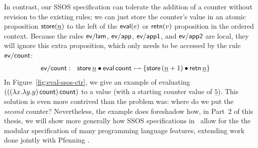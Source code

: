 In contrast, our SSOS specification can tolerate the
addition of a counter without revision to the existing rules; we can
just store the counter's value in an atomic proposition ${\sf
  store}(\underline{n})$ to the left of the ${\sf eval}(e)$ or ${\sf
  retn}(v)$ proposition in the ordered context. Because the rules
${\sf ev/lam}$, ${\sf ev/app}$, ${\sf ev/app1}$, and ${\sf ev/app2}$
are local, they will ignore this extra proposition, which only
needs to be accessed by the rule ${\sf ev/count}$:
\begin{align*}
{\sf ev/count} &:~~
  {\sf store}\,\underline n \mathbin{\bullet} {\sf eval}\,{\sf count}
    \rightarrowtail \{ {\sf store}\,(\underline n + 1) 
      \mathbin{\bullet} {\sf retn}\,\underline n \}
\end{align*}
In Figure~\ref{fig:eval-ssos-ctr}, we give an example of evaluating
$(((\lambda x.\lambda y.y)\,{\sf count})\,{\sf count})$ to a value
(with a starting counter value of $\underline 5$). This solution is
even more contrived than the problem was: where do we put the {\it
  second} counter? Nevertheless, the example does foreshadow how, in
Part~2 of this thesis, we will show more generally how SSOS
specifications in \sls~allow for the the modular specification of many
programming language features, extending work done jointly with
Pfenning \cite{pfenning09substructural}.

